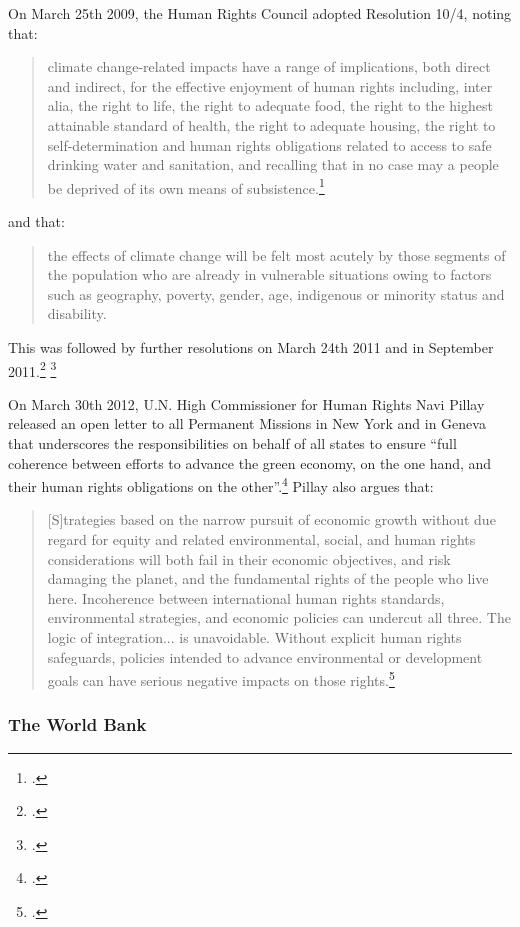 \documentclass[10pt]{article}
\begin{document}
On March 25th 2009, the Human Rights Council adopted Resolution 10/4, noting that:
\begin{quote}
climate change-related impacts have a range of implications, both direct and indirect, for the effective enjoyment of human rights including, inter alia, the right to life, the right to adequate food, the right to the highest attainable standard of health, the right to adequate housing, the right to self-determination and human rights obligations related to access to safe drinking water and sanitation, and recalling that in no case may a people be deprived of its own means of subsistence.\footcite[][]{UNHRC2009}
\end{quote}
and that:
\begin{quote}
the effects of climate change will be felt most acutely by those segments of the population who are already in vulnerable situations owing to factors such as geography, poverty, gender, age, indigenous or minority status and disability.
\end{quote}
This was followed by further resolutions on March 24th 2011 and in September 2011.\footcite[][]{UNHRC1611} \footcite[][]{UNHRC1822}



On March 30th 2012, U.N. High Commissioner for Human Rights Navi Pillay released an open letter to all Permanent Missions in New York and in Geneva that underscores the responsibilities on behalf of all states to ensure ``full coherence between efforts to advance the green economy, on the one hand, and their human rights obligations on the other''.\footcite[][p. 2]{Pillay2012}
Pillay also argues that:
\begin{quote}
[S]trategies based on the narrow pursuit of economic growth without due regard for equity and related environmental, social, and human rights considerations will both fail in their economic objectives, and risk damaging the planet, and the fundamental rights of the people who live here. Incoherence between international human rights standards, environmental strategies, and economic policies can undercut all three. The logic of integration... is unavoidable. Without explicit human rights safeguards, policies intended to advance environmental or development goals can have serious negative impacts on those rights.\footcite[][p. 2]{Pillay2012}
\end{quote}



	\subsubsection{The World Bank}
\end{document}

